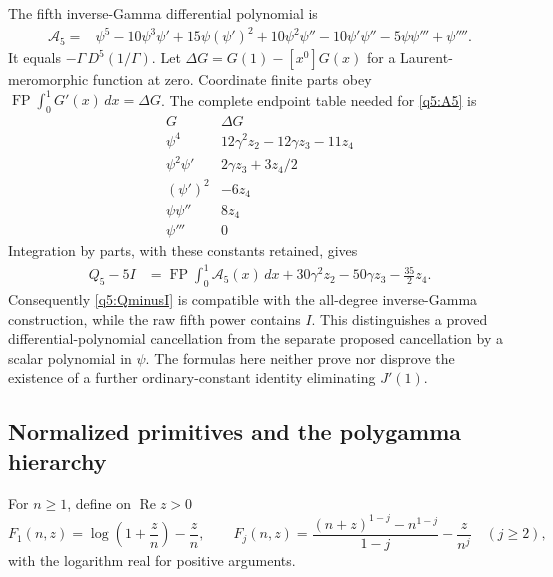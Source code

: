 \documentclass[11pt,a4paper]{article}
\numberwithin{equation}{section}
\theoremstyle{definition}
\begin{document}
The fifth inverse-Gamma differential polynomial is
\begin{align}\label{q5:A5}
 \mathcal A_5
 ={}&\psi^5-10\psi^3\psi'+15\psi(\psi')^2+10\psi^2\psi''
            -10\psi'\psi''-5\psi\psi'''+\psi''''.
\end{align}
It equals $-\Gamma\,D^5(1/\Gamma)$.
Let $\Delta G=G(1)-[x^0]G(x)$ for a Laurent-meromorphic function
at zero.  Coordinate finite parts obey
$\operatorname{FP}\int_0^1G'(x)\,dx=\Delta G$.
The complete endpoint table needed for \eqref{q5:A5} is
\begin{equation}\label{q5:endpoints}
\begin{array}{c|c}
G&\Delta G\\\hline
\psi^4&12\gamma^2z_2-12\gamma z_3-11z_4\\
\psi^2\psi'&2\gamma z_3+3z_4/2\\
(\psi')^2&-6z_4\\
\psi\psi''&8z_4\\
\psi'''&0
\end{array}
\end{equation}
Integration by parts, with these constants retained, gives
\begin{align}\label{q5:Bell-explanation}
 Q_5-5I
   &=\operatorname{FP}\int_0^1\mathcal A_5(x)\,dx
       +30\gamma^2z_2-50\gamma z_3-\frac{35}{2}z_4.
\end{align}
Consequently \eqref{q5:QminusI} is compatible with the all-degree
inverse-Gamma construction, while the raw fifth power contains $I$.
This distinguishes a proved differential-polynomial cancellation from
the separate proposed cancellation by a scalar polynomial in $\psi$.
The formulas here neither prove nor disprove the existence of a further
ordinary-constant identity eliminating $J'(1)$.

\subsection{Normalized primitives and the polygamma hierarchy}

For $n\geq1$, define on $\operatorname{Re}z>0$
\[
 F_1(n,z)=\log\left(1+\frac zn\right)-\frac zn,
 \qquad
 F_j(n,z)=\frac{(n+z)^{1-j}-n^{1-j}}{1-j}-\frac z{n^j}
 \quad(j\geq2),
\]
with the logarithm real for positive arguments.
\end{document}

